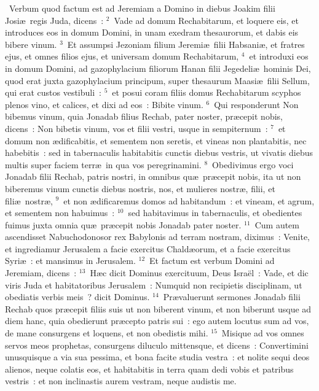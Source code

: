 ~\lettrine[lines=10,image=true,loversize=0.05,lraise=-0.03]{V}{}erbum quod factum est ad Jeremiam a Domino in diebus Joakim filii Josi\ae\ regis Juda, dicens~:
${}^{2}$~Vade ad domum Rechabitarum, et loquere eis, et introduces eos in domum Domini, in unam exedram thesaurorum, et dabis eis bibere vinum.
${}^{3}$~Et assumpsi Jezoniam filium Jeremi\ae\ filii Habsani\ae , et fratres ejus, et omnes filios ejus, et universam domum Rechabitarum,
${}^{4}$~et introduxi eos in domum Domini, ad gazophylacium filiorum Hanan filii Jegedeli\ae\ hominis Dei, quod erat juxta gazophylacium principum, super thesaurum Maasi\ae\ filii Sellum, qui erat custos vestibuli~:
${}^{5}$~et posui coram filiis domus Rechabitarum scyphos plenos vino, et calices, et dixi ad eos~: Bibite vinum.
${}^{6}$~Qui responderunt Non bibemus vinum, quia Jonadab filius Rechab, pater noster, pr\ae cepit nobis, dicens~: Non bibetis vinum, vos et filii vestri, usque in sempiternum~:
${}^{7}$~et domum non \ae dificabitis, et sementem non seretis, et vineas non plantabitis, nec habebitis~: sed in tabernaculis habitabitis cunctis diebus vestris, ut vivatis diebus multis super faciem terr\ae\ in qua vos peregrinamini.
${}^{8}$~Obedivimus ergo voci Jonadab filii Rechab, patris nostri, in omnibus qu\ae\ pr\ae cepit nobis, ita ut non biberemus vinum cunctis diebus nostris, nos, et mulieres nostr\ae , filii, et fili\ae\ nostr\ae ,
${}^{9}$~et non \ae dificaremus domos ad habitandum~: et vineam, et agrum, et sementem non habuimus~:
${}^{10}$~sed habitavimus in tabernaculis, et obedientes fuimus juxta omnia qu\ae\ pr\ae cepit nobis Jonadab pater noster.
${}^{11}$~Cum autem ascendisset Nabuchodonosor rex Babylonis ad terram nostram, diximus~: Venite, et ingrediamur Jerusalem a facie exercitus Chald\ae orum, et a facie exercitus Syri\ae~: et mansimus in Jerusalem.
${}^{12}$~Et factum est verbum Domini ad Jeremiam, dicens~:
${}^{13}$~H\ae c dicit Dominus exercituum, Deus Isra\"el~: Vade, et dic viris Juda et habitatoribus Jerusalem~: Numquid non recipietis disciplinam, ut obediatis verbis meis~? dicit Dominus.
${}^{14}$~Pr\ae valuerunt sermones Jonadab filii Rechab quos pr\ae cepit filiis suis ut non biberent vinum, et non biberunt usque ad diem hanc, quia obedierunt pr\ae cepto patris sui~: ego autem locutus sum ad vos, de mane consurgens et loquens, et non obedistis mihi.
${}^{15}$~Misique ad vos omnes servos meos prophetas, consurgens diluculo mittensque, et dicens~: Convertimini unusquisque a via sua pessima, et bona facite studia vestra~: et nolite sequi deos alienos, neque colatis eos, et habitabitis in terra quam dedi vobis et patribus vestris~: et non inclinastis aurem vestram, neque audistis me.
